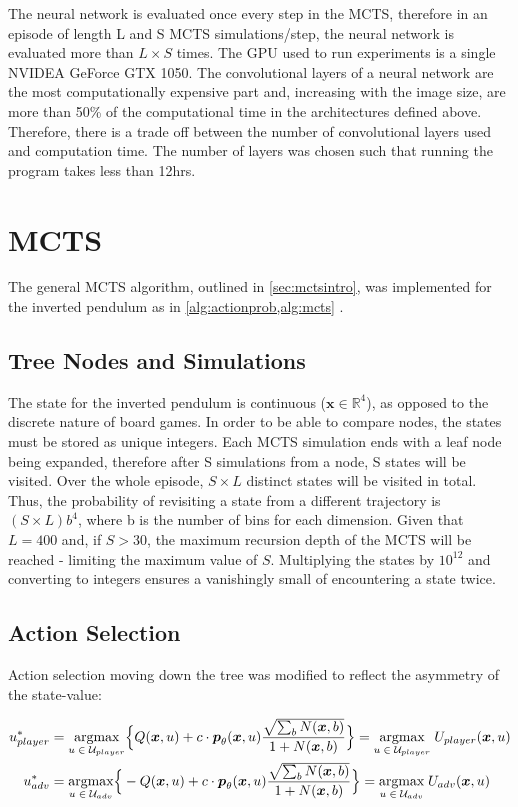 \documentclass[../main.tex]{subfiles}
\begin{document}
The neural network is evaluated once every step in the MCTS, therefore in an episode of length L and S MCTS simulations/step, the neural network is evaluated more than $L\times S$ times. The GPU used to run experiments is a single NVIDEA GeForce GTX 1050. The convolutional layers of a neural network are the most computationally expensive part and, increasing with the image size, are more than 50\% of the computational time in the architectures defined above. Therefore, there is a trade off between the number of convolutional layers used and computation time. The number of layers was chosen such that running the program takes less than 12hrs.

\section{MCTS}

The general MCTS algorithm, outlined in \cref{sec:mctsintro}, was implemented for the inverted pendulum as in \cref{alg:actionprob,alg:mcts} .

\subsection{Tree Nodes and Simulations}

The state for the inverted pendulum is continuous ($\boldsymbol{x} \in \mathbb{R}^4$), as opposed to the discrete nature of board games. In order to be able to compare nodes, the states must be stored as unique integers. Each MCTS simulation ends with a leaf node being expanded, therefore after S simulations from a node, S states will be visited. Over the whole episode, $S\times L$ distinct states will be visited in total. Thus, the probability of revisiting a state from a different trajectory is $(S \times L)b^4$, where b is the number of bins for each dimension. Given that $L=400$ and, if $S>30$, the maximum recursion depth of the MCTS will be reached - limiting the maximum value of $S$. Multiplying the states by $10^{12}$ and converting to integers ensures a vanishingly small of encountering a state twice.

\subsection{Action Selection}
Action selection moving down the tree was modified to reflect the asymmetry of the state-value:

{
\newcommand{\bx}{\boldsymbol{x}}
\begin{align}
   u^*_{player} & = \underset{u \; \in \; \mathcal{U}_{player}}{\text{argmax}} \Big{\{} Q(\bx, u) + c \cdot\boldsymbol{p}_\theta (\bx, u)\frac{\sqrt{\sum_b N(\bx, b)}}{1 + N(\bx, b)}\Big{\}} =  \underset{u \; \in \; \mathcal{U}_{player}}{\text{argmax}} \; U_{player}(\bx, u) \\
   u^*_{adv} & = \underset{u \; \in \; \mathcal{U}_{adv}}{\text{argmax}} \Big{\{} -Q(\bx, u) + c \cdot\boldsymbol{p}_\theta (\bx, u)\frac{\sqrt{\sum_b N(\bx, b)}}{1 + N(\bx, b)}\Big{\}} = \underset{u \; \in \; \mathcal{U}_{adv}}{\text{argmax}} \; U_{adv}(\bx, u)
   \label{eqn:IPucb}
\end{align}
}
\end{document}
